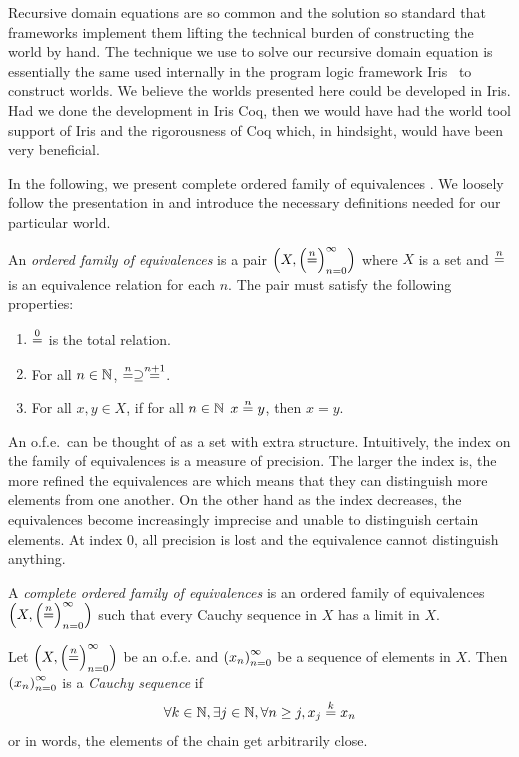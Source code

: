 \begin{jversion}
Recursive domain equations are so common and the solution so standard that frameworks implement them lifting the technical burden of constructing the world by hand.
The technique we use to solve our recursive domain equation is essentially the same used internally in the program logic framework Iris~\citep{iris1,iris2,iris3} to construct worlds.
We believe the worlds presented here could be developed in Iris.
Had we done the development in Iris Coq, then we would have had the world tool support of Iris and the rigorousness of Coq which, in hindsight, would have been very beneficial.

In the following, we present complete ordered family of equivalences \citep{di_gianantonio_2002}.
We loosely follow the presentation in \citet{birkedal_taste_2014} and introduce the necessary definitions needed for our particular world.
\begin{definition}
An \emph{ordered family of equivalences} is a pair $\cofe{X}$ where $X$ is a set and $\nequal$ is an equivalence relation for each $n$.
The pair must satisfy the following properties:
\begin{enumerate}
\item $\nequal[0]$ is the total relation.
\item For all $n \in \nats$, $\nequal[n] \supseteq \nequal[n+1]$.
\item For all $x,y \in X$,  if for all $n \in \nats$ $x \nequal y$, then $x = y$.
\end{enumerate}
\end{definition}
\noindent An o.f.e.\ can be thought of as a set with extra structure.
Intuitively, the index on the family of equivalences is a measure of precision.
The larger the index is, the more refined the equivalences are which means that they can distinguish more elements from one another.
On the other hand as the index decreases, the equivalences become increasingly imprecise and unable to distinguish certain elements.
At index 0, all precision is lost and the equivalence cannot distinguish anything.
\begin{definition}
  \label{def:cauchy-sequence}
  A \emph{complete ordered family of equivalences} is an ordered family of equivalences
  $\cofe{X}$ such that every Cauchy sequence in $X$ has a limit
  in $X$.

  Let $\cofe{X}$ be an o.f.e. and $\seq{x}$ be a sequence of
  elements in $X$. Then $\seq{x}$ is a \emph{Cauchy sequence} if
  \begin{align*}
    \forall k \in \nats, \exists j \in \nats, \forall n \geq j, x_j \nequal[k] x_n
  \end{align*}
  or in words, the elements of the chain get arbitrarily close.


\end{definition}
\end{jversion}
